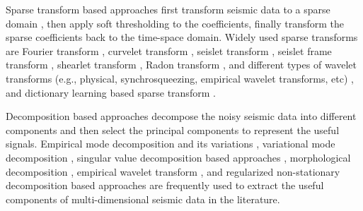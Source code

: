 Sparse transform based approaches first transform seismic data to a sparse domain \cite[]{sacchi1995,benfengpocs,yangkang2017sgk,weilin2017seg1}, then apply soft thresholding to the coefficients, finally transform the sparse coefficients back to the time-space domain. Widely used sparse transforms are Fourier transform \cite[]{pratt1998,mostafa2011,benfeng2015,jsevscan2016,jsefwi2016,zhongwei2016}, curvelet transform \cite[]{candes20061,hermann2007,neelamani2008,shaohuan2016,liuwei20162}, seislet transform \cite[]{fomel2010seislet,liuyang2010,liuyang2014,yangkang20142,yangkang2015emdseis,shuwei20153,shuwei2015seg2,shuwei2016cs,liuwei2016dealiase}, seislet frame transform \cite[]{fomel2010seislet,shuwei2015seg1,shuwei20163}, shearlet transform \cite[]{jsedecon2016,jseshearlet2016}, Radon transform \cite[]{sacchi1995,yaru2014,jsedemul2016,yaru2016,yaru20172}, and different types of wavelet transforms (e.g., physical, synchrosqueezing, empirical wavelet transforms, etc) \cite[]{donoho1994,zhangr2003,jinghuai2006,xieqian2015eage,liuwei2016sswt,liuwei2016}, and dictionary learning based sparse transform \cite[]{elad2006,mairal2008,siwei2015,yangkang2016dsd,amir2017,amir2017geo}. 

Decomposition based approaches decompose the noisy seismic data into different components and then select the principal components to represent the useful signals. Empirical mode decomposition and its variations \cite[]{yangkang20141,yangkang2015enhemd,shuwei2016ag,chenwei2016,chenwei2016seg2,chenwei2017,chenwei2017emd,chenwei2017iceemd}, variational mode decomposition \cite[]{liuwei2016eage,liuwei2016vmd,liuwei2017}, singular value decomposition based approaches \cite[]{bekara2007,weilin2016seg2,yufeng2017}, morphological decomposition \cite[]{huijian2016,huijian20162,weilin2017morph,weilin2017ieee2,weilin2017gji}, empirical wavelet transform \cite[]{gilles2013,kumar2015}, and regularized non-stationary decomposition based approaches \cite[]{fomel20132,guoning2017} are frequently used to extract the useful components of multi-dimensional seismic data in the literature. 

